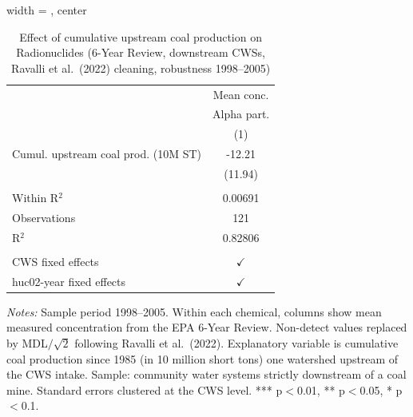 
\begin{table}[htbp]
   
   \caption{\label{tab:6yr_huc02fe_radio_ravalli_2005} Effect of cumulative upstream coal production on Radionuclides (6-Year Review, downstream CWSs, Ravalli et al.~(2022) cleaning, robustness 1998--2005)}
   \bigskip
   
   \centering
   
   \begin{adjustbox}{width = \textwidth, center}
      
      
      \begin{tabular}{lc}
         \toprule
         
                                             & Mean conc.\\  
         
                                             & Alpha part. \\   
         
                                             & (1)\\  
         
         \midrule 
         Cumul. upstream coal prod. (10M ST) & -12.21\\   
                                             & (11.94)\\   
         
          \\
         
         Within R$^2$                        & 0.00691\\  
         Observations                        & 121\\  
         R$^2$                               & 0.82806\\  
         
          \\
         
         CWS fixed effects                   & $\checkmark$\\   
         huc02-year fixed effects            & $\checkmark$\\   
         
         \bottomrule
         
      \end{tabular}
      
      
      
   \end{adjustbox}
      {\tiny\linespread{1}\selectfont \par \raggedright 
   \textit{Notes:} Sample period 1998--2005. Within each chemical, columns show mean measured concentration from the EPA 6-Year Review. Non-detect values replaced by MDL$/\sqrt{2}$ following Ravalli et al.~(2022). Explanatory variable is cumulative coal production since 1985 (in 10 million short tons) one watershed upstream of the CWS intake. Sample: community water systems strictly downstream of a coal mine. Standard errors clustered at the CWS level. *** p$<$0.01, ** p$<$0.05, * p$<$0.1.}
   
\end{table}


